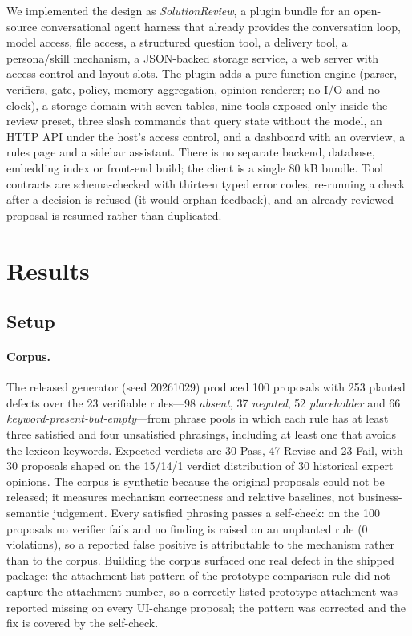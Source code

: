 \documentclass{IOS-Book-Article}
\begin{document}
We implemented the design as \emph{SolutionReview}, a plugin bundle for an open-source conversational agent harness that already provides the conversation loop, model access, file access, a structured question tool, a delivery tool, a persona/skill mechanism, a JSON-backed storage service, a web server with access control and layout slots. The plugin adds a pure-function engine (parser, verifiers, gate, policy, memory aggregation, opinion renderer; no I/O and no clock), a storage domain with seven tables, nine tools exposed only inside the review preset, three slash commands that query state without the model, an HTTP API under the host's access control, and a dashboard with an overview, a rules page and a sidebar assistant. There is no separate backend, database, embedding index or front-end build; the client is a single 80 kB bundle. Tool contracts are schema-checked with thirteen typed error codes, re-running a check after a decision is refused (it would orphan feedback), and an already reviewed proposal is resumed rather than duplicated.

\section{Results}

\subsection{Setup}

\paragraph{Corpus.}
The released generator (seed 20261029) produced 100 proposals with 253 planted defects over the 23 verifiable rules---98 \emph{absent}, 37 \emph{negated}, 52 \emph{placeholder} and 66 \emph{keyword-present-but-empty}---from phrase pools in which each rule has at least three satisfied and four unsatisfied phrasings, including at least one that avoids the lexicon keywords. Expected verdicts are 30 Pass, 47 Revise and 23 Fail, with 30 proposals shaped on the 15/14/1 verdict distribution of 30 historical expert opinions. The corpus is synthetic because the original proposals could not be released; it measures mechanism correctness and relative baselines, not business-semantic judgement. Every satisfied phrasing passes a self-check: on the 100 proposals no verifier fails and no finding is raised on an unplanted rule (0 violations), so a reported false positive is attributable to the mechanism rather than to the corpus. Building the corpus surfaced one real defect in the shipped package: the attachment-list pattern of the prototype-comparison rule did not capture the attachment number, so a correctly listed prototype attachment was reported missing on every UI-change proposal; the pattern was corrected and the fix is covered by the self-check.
\end{document}
